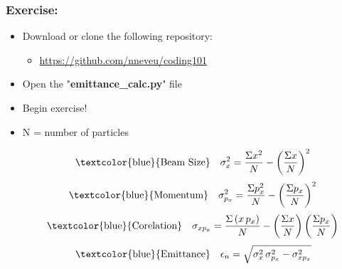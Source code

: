 \documentclass[xcolor=dvipsnames, professionalfonts,t]{beamer}
\begin{document}
\begin{frame}
\frametitle{Exercise:}
\begin{itemize}
	\item Download or clone the following repository: 
	\begin{itemize}
		\item \url{https://github.com/nneveu/coding101}
	\end{itemize}
	\item Open the "\textbf{emittance\_calc.py}" file
	\item Begin exercise!
	\item N = number of particles
	\vspace{-1em}
	
	\begin{equation}
		\text{\textcolor{blue}{Beam Size}} \quad \sigma_x^2 = \frac{\Sigma x^2}{N} - \left(\frac{\Sigma x}{N}\right)^2
	\end{equation}
	\begin{equation}
	\text{\textcolor{blue}{Momentum}} \quad \sigma_{p_x}^2 = \frac{\Sigma p_x^2}{N} - \left(\frac{\Sigma p_x}{N}\right)^2
	\end{equation}
	\begin{equation}
	\text{\textcolor{blue}{Corelation}} \quad \sigma_{xp_x} = \frac{\Sigma \left(x\,p_x\right)}{N} - \left(\frac{\Sigma x}{N}\right)\left(\frac{\Sigma p_x}{N}\right)
	\end{equation}
	\begin{equation}\label{eq:emittance}
	\begin{aligned}
	\text{\textcolor{blue}{Emittance}} \quad
	\epsilon_n = \sqrt{\sigma_x^2\, \sigma_{p_x}^2 -\sigma_{xp_x}^2}
	\end{aligned}
	\end{equation}
\end{itemize}
\end{frame}


\end{document}
